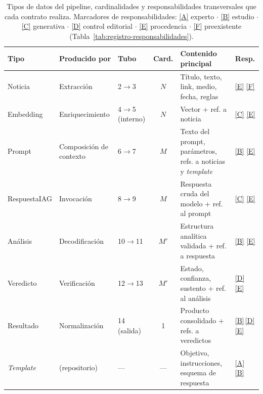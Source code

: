 \documentclass[12pt]{report}
\DeclareRobustCommand{\resp}[1]{\hyperref[tab:registro-responsabilidades]{\textcolor{respcolor}{[#1]}}}
\DeclareRobustCommand{\respleyenda}{Marcadores de responsabilidades: \resp{A} experto \(\cdot\) \resp{B} estudio \(\cdot\) \resp{C} generativa \(\cdot\) \resp{D} control editorial \(\cdot\) \resp{E} procedencia \(\cdot\) \resp{F} preexistente (Tabla~\ref{tab:registro-responsabilidades}).}
\begin{document}
\begin{table}[H]
  \centering
  \caption{Tipos de datos del pipeline, cardinalidades y responsabilidades transversales que cada contrato realiza. \respleyenda}
  \label{tab:tipos-resumen}
  \footnotesize
  \setlength{\tabcolsep}{3pt}
  \begin{tabularx}{\textwidth}{@{}l l l c X >{\raggedright\arraybackslash}p{1.3cm}@{}}
    \toprule
    \textbf{Tipo}     & \textbf{Producido por}  & \textbf{Tubo}     & \textbf{Card.} & \textbf{Contenido principal}                                       & \textbf{Resp.}              \\
    \midrule
    Noticia           & Extracción              & 2$\to$3           & $N$            & Título, texto, link, medio, fecha, reglas                          & \resp{E} \resp{F}           \\
    Embedding         & Enriquecimiento         & 4$\to$5 (interno) & $N$            & Vector + ref. a noticia                                            & \resp{C} \resp{E}           \\
    Prompt            & Composición de contexto & 6$\to$7           & $M$            & Texto del prompt, parámetros, refs. a noticias y \textit{template} & \resp{B} \resp{E}           \\
    RespuestaIAG      & Invocación              & 8$\to$9           & $M$            & Respuesta cruda del modelo + ref. al prompt                        & \resp{C} \resp{E}           \\
    Análisis          & Decodificación          & 10$\to$11         & $M'$           & Estructura analítica validada + ref. a respuesta                   & \resp{B} \resp{E}           \\
    Veredicto         & Verificación            & 12$\to$13         & $M'$           & Estado, confianza, sustento + ref. al análisis                     & \resp{D} \resp{E}           \\
    Resultado         & Normalización           & 14 (salida)       & 1              & Producto consolidado + refs. a veredictos                          & \resp{B}\,\resp{D} \resp{E} \\
    \textit{Template} & (repositorio)           & ---               & ---            & Objetivo, instrucciones, esquema de respuesta                      & \resp{A} \resp{B}           \\
    \bottomrule
  \end{tabularx}
\end{table}
\end{document}
